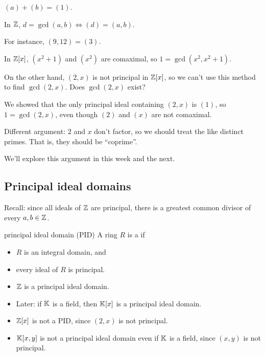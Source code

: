 \documentclass[12pt,letterpaper]{report}
\begin{document}
\begin{thmproof}
  $(a) + (b) = (1)$.
\end{thmproof}

\begin{ex}
  In $\mathbb{Z}$, $d = \gcd(a, b) \iff (d) = (a, b)$.

  For instance, $(9, 12) = (3)$.
\end{ex}

\begin{ex}
  In $\mathbb{Z}[x]$, $(x^2 + 1)$ and $(x^2)$ are comaximal, so $1 = \gcd(x^2, x^2 + 1)$.

  On the other hand, $(2, x)$ is not principal in $\mathbb{Z}[x]$, so we can't use this method to find
  $\gcd(2, x)$.
  Does $\gcd(2, x)$ exist?

  We showed that the only principal ideal containing $(2, x)$ is $(1)$, so $1 = \gcd(2, x)$,
  even though $(2)$ and $(x)$ are not comaximal.

  Different argument: $2$ and $x$ don't factor, so we should treat the like distinct primes.
  That is, they should be ``coprime''.

  We'll explore this argument in this week and the next.
\end{ex}

\pagebreak
\subsection{Principal ideal domains}

Recall: since all ideals of $\mathbb{Z}$ are principal, there is a greatest common divisor of every
$a, b \in \mathbb{Z}$.

\begin{defn}{principal ideal domain (PID)}{}
  A ring $R$ is a  if
  \begin{itemize}
    \item $R$ is an integral domain, and
    \item every ideal of $R$ is principal.
  \end{itemize}
\end{defn}

\begin{ex}
  \begin{itemize}
    \item $\mathbb{Z}$ is a principal ideal domain.
    \item Later: if $\mathbb{K}$ is a field, then $\mathbb{K}[x]$ is a principal ideal domain.
    \item $\mathbb{Z}[x]$ is not a PID, since $(2, x)$ is not principal.
    \item $\mathbb{K}[x, y]$ is not a principal ideal domain even if $\mathbb{K}$ is a field, since $(x, y)$ is not
      principal.
  \end{itemize}
\end{ex}
\end{document}

